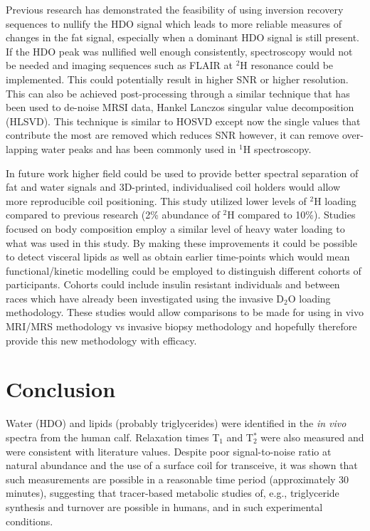 \documentclass[class=article, crop=false]{standalone}
\begin{document}
Previous research has demonstrated the feasibility of using inversion recovery sequences to nullify the HDO signal which leads to more reliable measures of changes in the fat signal\cite{Brereton1989TheMice}, especially when a dominant HDO signal is still present. If the HDO peak was nullified well enough consistently, spectroscopy would not be needed and imaging sequences such as FLAIR at $^2$H resonance could be implemented. This could potentially result in higher SNR or higher resolution. This can also be achieved post-processing through a similar technique that has been used to de-noise MRSI data, Hankel Lanczos singular value decomposition (HLSVD). This technique is similar to HOSVD except now the single values that contribute the most are removed which reduces SNR however, it can remove over-lapping water peaks and has been commonly used in $^1$H spectroscopy\cite{Jansen20061HMetabolites, Cabanes2001OptimizationBrain}.

In future work higher field could be used to provide better spectral separation of fat and water signals and 3D-printed, individualised coil holders would allow more reproducible coil positioning. This study utilized lower levels of $^2$H loading compared to previous research (2\% abundance of $^2$H compared to 10\%). Studies focused on body composition employ a similar level of heavy water loading to what was used in this study. By making these improvements it could be possible to detect visceral lipids as well as obtain earlier time-points which would mean functional/kinetic modelling could be employed to distinguish different cohorts of participants. Cohorts could include insulin resistant individuals\cite{White2017AssociationHumans} and between races\cite{White2018RacialHumans} which have already been investigated using the invasive D$_2$O loading methodology. These studies would allow comparisons to be made for using in vivo MRI/MRS methodology vs invasive biopsy methodology and hopefully therefore provide this new methodology with efficacy.

\section{Conclusion}

Water (HDO) and lipids (probably triglycerides) were identified in the \textit{in vivo} spectra from the human calf. Relaxation times T$_1$ and T$_2^*$ were also measured and were consistent with literature values. Despite poor signal-to-noise ratio at natural abundance and the use of a surface coil for transceive, it was shown that such measurements are possible in a reasonable time period (approximately 30 minutes), suggesting that tracer-based metabolic studies of, e.g., triglyceride synthesis and turnover are possible in humans, and in such experimental conditions.  
\end{document}
